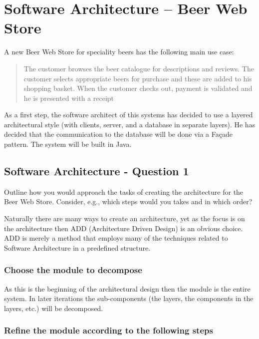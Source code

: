 \section{Software Architecture -- Beer Web Store}

A new Beer Web Store for speciality beers has the following main use
case:
\begin{quote}
  The customer browses the beer catalogue for descriptions and
  reviews. The customer selects appropriate beers for purchase and
  these are added to his shopping basket. When the customer checks
  out, payment is validated and he is presented with a receipt
\end{quote}
As a first step, the software architect of this systems has decided to
use a layered architectural style (with clients, server, and a
database in separate layers). He has decided that the communication to
the database will be done via a Fa\c cade pattern. The system will be
built in Java.

\subsection{Software Architecture - Question 1}
\begin{question}
Outline how you would approach the tasks of creating the
architecture for the Beer Web Store. Consider, e.g., which steps
would you takes and in which order?
\end{question}

Naturally there are many ways to create an architecture, yet as the focus is on the architecture then ADD (Architecture Driven Design) is an obvious choice. ADD is merely a method that employs many of the techniques related to Software Architecture in a predefined structure.

\subsubsection{Choose the module to decompose}
As this is the beginning of the architectural design then the module is the entire system. In later iterations the sub-components (the layers, the components in the layers, etc.) will be decomposed.

\subsubsection{Refine the module according to the following steps}

